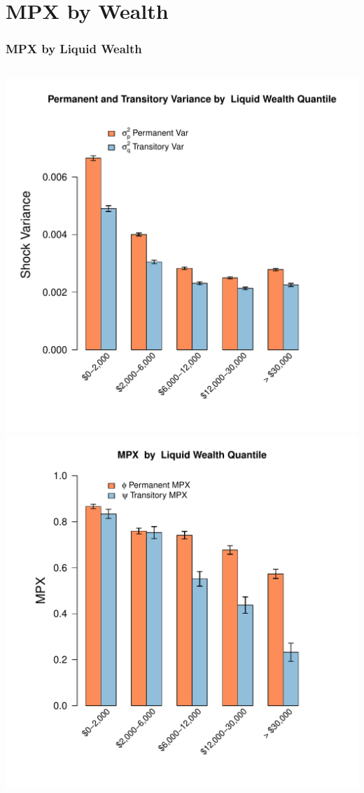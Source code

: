 \documentclass{beamer}
\begin{document}
\section{MPX by Wealth}
\frame
{
	\frametitle{MPX by Liquid Wealth}
	\label{MPXbyLiquidWealth}
	\begin{columns}
		\centering
		\includegraphics[scale=0.35]{../Figures/VarianceByLiquidWealth_level_lincome_head.pdf}
		\centering
		\includegraphics[scale=0.35]{../Figures/MPXByLiquidWealth_level_lincome_head.pdf}
	\end{columns} 
	\hyperlink{MPXbyNetWealth}{}	
}
\end{document}
